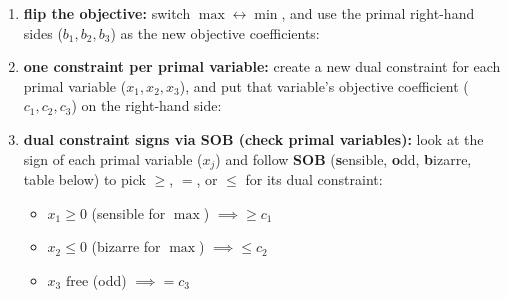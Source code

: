 \documentclass[a4paper, 11pt]{report}
\begin{document}
\begin{enumerate}
    \item \textbf{flip the objective:} switch $\max \leftrightarrow \min$, and use the primal right-hand sides ($b_1, b_2, b_3$) as the new objective coefficients:

    \smallskip
    \noindent{}

    \item \textbf{one constraint per primal variable:} create a new dual constraint for each primal variable ($x_1, x_2, x_3$), and put that variable's objective coefficient ($c_1, c_2, c_3$) on the right-hand side:

    \smallskip
    \noindent{}

    \item \textbf{dual constraint signs via SOB (check primal variables):} look at the sign of each primal variable ($x_j$) and follow \textbf{SOB} (\textbf{s}ensible, \textbf{o}dd, \textbf{b}izarre, table below) to pick $\ge$, $=$, or $\le$ for its dual constraint:
    \begin{itemize}
        \item $x_1 \ge 0$ (sensible for $\max$) $\implies \ge c_1$
        \item $x_2 \le 0$ (bizarre for $\max$) $\implies \le c_2$
        \item $x_3 \text{ free}$ (odd) $\implies = c_3$
    \end{itemize}

    \smallskip
    \noindent{}


\end{enumerate}
\end{document}
